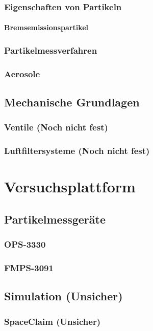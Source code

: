 \subsection{Eigenschaften von Partikeln}
\subsubsection{Bremsemissionspartikel}
\subsection{Partikelmessverfahren}
\subsection{Aerosole}

\section{Mechanische Grundlagen}
\subsection{Ventile (Noch nicht fest)}
\subsection{Luftfiltersysteme (Noch nicht fest)}


\chapter{Versuchsplattform}\label{ch:platform}
\section{Partikelmessger\"{a}te}
\subsection{OPS-3330}
\subsection{FMPS-3091}

\section{Simulation (Unsicher)}
\subsection{SpaceClaim (Unsicher)}

